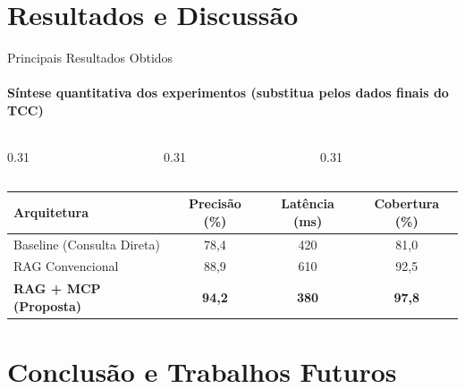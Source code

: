 \documentclass[aspectratio=169, 11pt]{beamer}
\begin{document}
\section{Resultados e Discussão}

\begin{frame}{Principais Resultados Obtidos}
  \framesubtitle{Síntese quantitativa dos experimentos (substitua pelos dados finais do TCC)}
  \begin{columns}[T, onlytextwidth]
    \begin{column}{0.31\textwidth}
    \end{column}
    \begin{column}{0.31\textwidth}
    \end{column}
    \begin{column}{0.31\textwidth}
    \end{column}
  \end{columns}

  \vspace{0.5cm}
  \centering
  \small
  \begin{tabular}{@{}lccc@{}}
    \toprule
    \textbf{Arquitetura} & \textbf{Precisão (\%)} & \textbf{Latência (ms)} & \textbf{Cobertura (\%)} \\
    \midrule
    Baseline (Consulta Direta) & 78,4 & 420 & 81,0 \\
    RAG Convencional           & 88,9 & 610 & 92,5 \\
    \textbf{RAG + MCP (Proposta)} & \textbf{94,2} & \textbf{380} & \textbf{97,8} \\
    \bottomrule
  \end{tabular}
\end{frame}

\section{Conclusão e Trabalhos Futuros}
\end{document}
